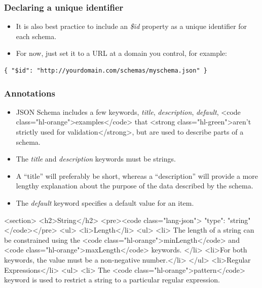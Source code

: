 \documentclass{efd-lecture}
\begin{document}
\begin{frame}[fragile]
  \frametitle{Declaring a unique identifier}
  \begin{itemize}
    \item It is also best practice to include an
      \textit{\color{YellowOrange} \$id} property as a unique identifier for
      each schema.
    \item For now, just set it to a URL at a domain you control, for example:
  \end{itemize}
  \begin{verbatim}
{ "$id": "http://yourdomain.com/schemas/myschema.json" }
  \end{verbatim}
\end{frame}

\begin{frame}
  \frametitle{Annotations}
  \begin{itemize}
    \item JSON Schema includes a few keywords,
      \textit{\color{YellowOrange} title},
      \textit{\color{YellowOrange} description},
      \textit{\color{YellowOrange} default},
        <code class="hl-orange">examples</code> that
        <strong class="hl-green">aren’t strictly used for validation</strong>,
        but are used to describe parts of a schema.
    \item The \textit{\color{Yellow}title} and
      \textit{\color{Yellow}description} keywords must be strings.
    \item
        A ``title'' will preferably be short, whereas a ``description'' will provide
        a more lengthy explanation about the purpose of the data described by
        the schema.
    \item The \textit{\color{Cyan}default} keyword specifies a default
      value for an item.
  \end{itemize}
\end{frame}
  <section>
    <h2>String</h2>
    <pre><code class="lang-json">
{ "type": "string" }
    </code></pre>
    <ul>
      <li>Length</li>
      <ul>
        <li>
          The length of a string can be constrained using the
          <code class="hl-orange">minLength</code> and
          <code class="hl-orange">maxLength</code> keywords.
        </li>
        <li>For both keywords, the value must be a non-negative number.</li>
      </ul>
      <li>Regular Expressions</li>
      <ul>
        <li>
          The <code class="hl-orange">pattern</code> keyword is used to restrict
          a string to a particular regular expression.
\end{document}
